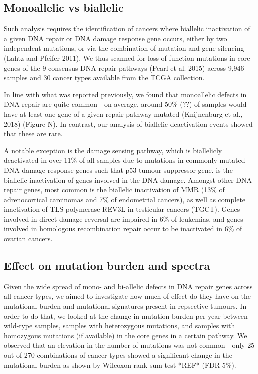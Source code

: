 \subsection{Monoallelic vs biallelic}

Such analysis requires the identification of cancers where biallelic inactivation of a 
given DNA repair or DNA damage response gene occurs, either by two independent mutations, 
or via the combination of mutation and gene silencing (Lahtz and Pfeifer 2011). 
We thus scanned for loss-of-function mutations in core genes of the 9 consensus 
DNA repair pathways (Pearl et al. 2015) across 9,946 samples and 30 cancer types 
available from the TCGA collection.

In line with what was reported previously, we found that monoallelic defects in DNA repair are quite common - on average, around 50\% (??) of samples would have at least one gene of a given repair pathway mutated (Knijnenburg et al., 2018) (Figure N). In contrast, our analysis of biallelic deactivation events showed that these are rare.

A notable exception is the damage sensing pathway, which is biallelicly deactivated in over 11\% of all samples due to mutations in commonly mutated DNA damage response genes such that p53 tumour suppressor gene. is the biallelic inactivation of genes involved in the DNA damage. Amongst other DNA repair genes, most common is the biallelic inactivation of MMR (13\% of adrenocortical carcinomas and 7\% of endometrial cancers), as well as complete inactivation of TLS polymerase REV3L in testicular cancers (TGCT). Genes involved in direct damage reversal are impaired in 6\% of leukemias, and genes involved in homologous recombination repair occur to be inactivated  in  6\% of ovarian cancers.

\subsection{Effect on mutation burden and spectra}

Given the wide spread of mono- and bi-allelic defects in DNA repair genes across all cancer types, we aimed to investigate how much of effect do they have on the mutational burden and mutational signatures present in repsective tumours. In order to do that, we looked at the change in mutation burden per year between wild-type samples, samples with heterozygous mutations, and samples with homozygous mutations (if available) in the core genes in a certain pathway. We observed that an elevation in the number of mutations was not common - only 25 out of 270 combinations of cancer types showed a significant change in the mutational burden as shown by Wilcoxon rank-sum test *REF* (FDR 5\%).

